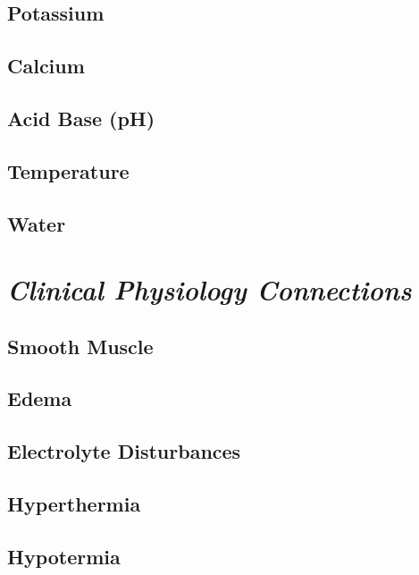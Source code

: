 \subsection{Potassium}

\subsection{Calcium}

\subsection{Acid Base (pH)}

\subsection{Temperature}

\subsection{Water}



\section{\textit{Clinical Physiology Connections}}

\subsection{Smooth Muscle}

\subsection{Edema}

\subsection{Electrolyte Disturbances}

\subsection{Hyperthermia}

\subsection{Hypotermia}

\printbibliography[heading=subbibintoc]
